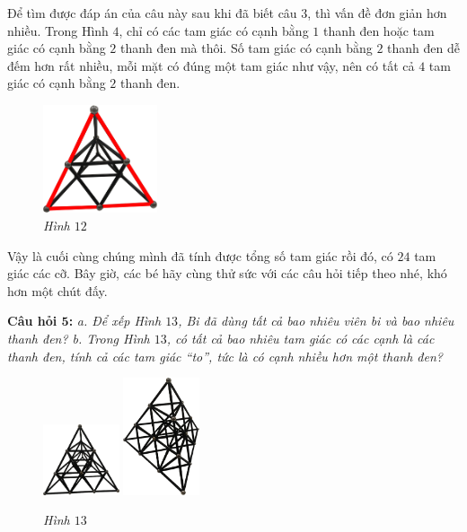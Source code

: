 	\vspace*{-5pt}
	\begin{multicols}{2}
		Để tìm được đáp án của câu này sau khi đã biết câu $3$, thì vấn đề đơn giản hơn nhiều. Trong Hình $4$, chỉ có các tam giác có cạnh bằng $1$  thanh đen hoặc tam giác có cạnh bằng $2$ thanh đen mà thôi. Số tam giác có cạnh bằng $2$ thanh đen dễ đếm hơn rất nhiều, mỗi mặt có đúng một tam giác như vậy, nên có tất cả $4$ tam giác có cạnh bằng $2$ thanh đen.
		\begin{figure}[H]
			\centering
			\vspace*{-5pt}
			\captionsetup{labelformat= empty, justification=centering} \includegraphics[width=0.3\textwidth]{12}
			\caption{\small\textit{Hình $12$}}
			\vspace*{-5pt}
		\end{figure}
	\end{multicols}
	Vậy là cuối cùng chúng mình đã tính được tổng số tam giác rồi đó, có $24$ tam giác các cỡ.
	\vskip 0.1cm
	Bây giờ, các bé hãy cùng thử sức với các câu hỏi tiếp theo nhé, khó hơn một chút đấy.
	\begin{multicols}{2}
	\textbf{\color{toancuabi}Câu hỏi $\pmb{5}$:} \textit{a. Để xếp Hình $13$, Bi đã dùng tất cả bao nhiêu viên bi và bao nhiêu thanh đen? 
	\vskip 0.1cm
	b. Trong Hình $13$, có tất cả bao nhiêu tam giác có các cạnh là các thanh đen, tính cả các tam giác “to”, tức là có cạnh nhiều hơn một thanh đen?}
	\begin{figure}[H]
		\centering
		\vspace*{5pt}
		\captionsetup{labelformat= empty, justification=centering} \includegraphics[width=0.2\textwidth]{13}
		\quad
		\includegraphics[width=0.2\textwidth]{13a}
		\caption{\small\textit{Hình $13$}}
		\vspace*{-5pt}
	\end{figure}
	\end{multicols}







